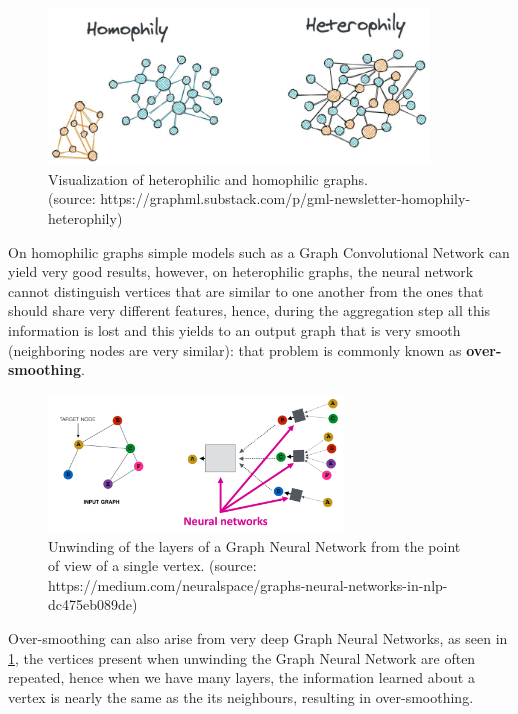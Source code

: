 \documentclass[12pt]{article}
\begin{document}
\begin{figure}[h]
\centering
\includegraphics[width=0.9\textwidth]{images/homophilyVSheterophily.jpeg}
\caption{Visualization of heterophilic and homophilic graphs. \\(source: https://graphml.substack.com/p/gml-newsletter-homophily-heterophily)}
\end{figure}

 On homophilic graphs simple models such as a Graph Convolutional Network can yield very good results, however, on heterophilic graphs, the neural network cannot distinguish vertices that are similar to one another from the ones that should share very different features, hence, during the aggregation step all this information is lost and this yields to an output graph that is very smooth (neighboring nodes are very similar): that problem is commonly known as \textbf{over-smoothing}.
\\


\begin{figure}[h!]
\centering
\includegraphics[width=0.7\textwidth]{images/gnn-unwinding.png}
\caption{Unwinding of the layers of a Graph Neural Network from the point of view of a single vertex. (source: https://medium.com/neuralspace/graphs-neural-networks-in-nlp-dc475eb089de)}
\label{fig:gnnunwinding}
\end{figure}

Over-smoothing can also arise from very deep Graph Neural Networks, as seen in \ref{fig:gnnunwinding}, the vertices present when unwinding the Graph Neural Network are often repeated, hence when we have many layers, the information learned about a vertex is nearly the same as the its neighbours, resulting in over-smoothing.
\\
\end{document}

